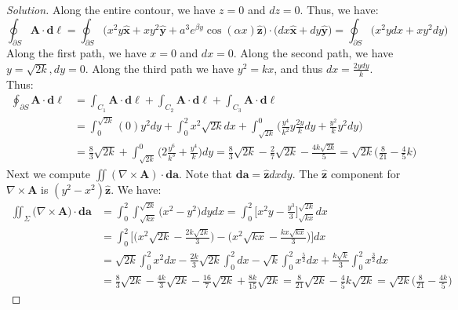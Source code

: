 \documentclass[oneside]{book}
\theoremstyle{mystyle}
\begin{document}
\begin{proof}[Solution]
Along the entire contour, we have $z=0$ and $dz=0$. Thus, we have:
\begin{equation*}
    \oint_{\partial S}\mathbf{A}\cdot\boldsymbol{d\ell}=\oint_{\partial S}\big(x^{2}y\hat{\mathbf{x}}+xy^{2}\hat{\mathbf{y}}+a^{3}e^{\beta y}\cos(\alpha x)\hat{\mathbf{z}}\big)\cdot\big(dx\hat{\mathbf{x}}+dy\hat{\mathbf{y}}\big)=\oint_{\partial S}\big(x^{2}ydx+xy^{2}dy\big)
\end{equation*}
Along the first path, we have $x=0$ and $dx=0$. Along the second path, we have $y=\sqrt{2k}, dy=0$. Along the third path we have $y^2=kx$, and thus $dx = \frac{2ydy}{k}$. Thus:
\begin{align*}
    \oint_{\partial S}\mathbf{A}\cdot\boldsymbol{d\ell}&=\int_{C_{1}}\mathbf{A}\cdot\boldsymbol{d\ell}+\int_{C_{2}}\mathbf{A}\cdot\boldsymbol{d\ell}+\int_{C_{3}}\mathbf{A}\cdot\boldsymbol{d\ell}\\
    &=\int_{0}^{\sqrt{2k}}(0)y^{2}dy+\int_{0}^{2}x^{2}\sqrt{2k}dx+\int_{\sqrt{2k}}^{0}\big(\frac{y^{4}}{k^2}y\frac{2y}{k}dy+\frac{y^{2}}{k}y^{2}dy\big)\\
    &=\frac{8}{3}\sqrt{2k}+\int_{\sqrt{2k}}^{0}\big(2\frac{y^{6}}{k^{3}}+\frac{y^{4}}{k}\big)dy=\frac{8}{3}\sqrt{2k}-\frac{2}{7}\sqrt{2k}-\frac{4k\sqrt{2k}}{5}=\sqrt{2k}\big(\frac{8}{21}-\frac{4}{5}k\big)
\end{align*}
Next we compute $\iint (\nabla \times \mathbf{A})\cdot \boldsymbol{da}$. Note that $\boldsymbol{da} = \hat{\mathbf{z}}dxdy$. The $\hat{\mathbf{z}}$ component for $\nabla \times \mathbf{A}$ is $(y^{2}-x^{2})\hat{\mathbf{z}}$. We have:
\begin{align*}
    \iint_{\Sigma}\big(\nabla\times\mathbf{A}\big)\cdot\boldsymbol{da}&=\int_{0}^{2}\int_{\sqrt{kx}}^{\sqrt{2k}} \big(x^{2}-y^{2}\big)dydx=\int_{0}^{2}\bigg[x^{2}y-\frac{y^{3}}{3}\bigg]_{\sqrt{kx}}^{\sqrt{2k}}dx\\
    &= \int_{0}^{2}\bigg[\bigg(x^{2}\sqrt{2k} - \frac{2k\sqrt{2k}}{3}\bigg) - \bigg(x^{2}\sqrt{kx} - \frac{kx\sqrt{kx}}{3}\bigg)\bigg]dx\\
    &= \sqrt{2k}\int_{0}^{2}x^2 dx - \frac{2k}{3}\sqrt{2k}\int_{0}^{2}dx - \sqrt{k}\int_{0}^{2}x^{\frac{5}{2}}dx + \frac{k\sqrt{k}}{3}\int_{0}^{2}x^{\frac{3}{2}}dx\\
    &=\frac{8}{3}\sqrt{2k}-\frac{4k}{3}\sqrt{2k}-\frac{16}{7}\sqrt{2k}+\frac{8k}{15}\sqrt{2k}=\frac{8}{21}\sqrt{2k}-\frac{4}{5}k\sqrt{2k}=\sqrt{2k}\big(\frac{8}{21}-\frac{4k}{5}\big)
\end{align*}
\end{proof}
\end{document}
